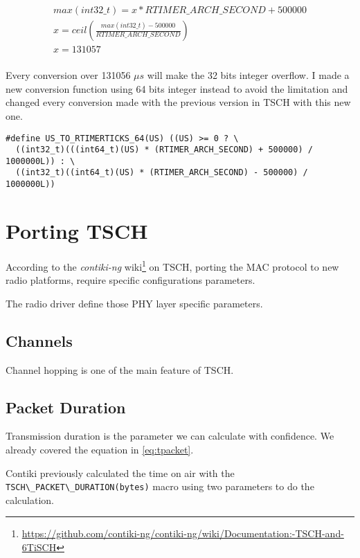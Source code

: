 \begin{equation}
  \label{eq:maxus}
  \begin{multlined}
  max(int32\_t) = x * RTIMER\_ARCH\_SECOND + 500000 \\
  x = ceil(\frac{max(int32\_t) - 500000}{RTIMER\_ARCH\_SECOND}) \\
  x = 131057 \\
  \end{multlined}
\end{equation}

Every conversion over 131056 $\mu s$ will make the 32 bits integer overflow.
I made a new conversion function using 64 bits integer instead to avoid the
limitation and changed every conversion made with the previous version in TSCH
with this new one.

\begin{lstlisting}
#define US_TO_RTIMERTICKS_64(US) ((US) >= 0 ? \
  ((int32_t)(((int64_t)(US) * (RTIMER_ARCH_SECOND) + 500000) / 1000000L)) : \
  ((int32_t)((int64_t)(US) * (RTIMER_ARCH_SECOND) - 500000) / 1000000L)) 
\end{lstlisting}

\section{Porting TSCH}

According to the \emph{contiki-ng}
wiki\footnote{\url{https://github.com/contiki-ng/contiki-ng/wiki/Documentation:-TSCH-and-6TiSCH}}
on TSCH, porting the MAC protocol to new radio platforms, require specific
configurations parameters.

The radio driver define those PHY layer specific parameters.

\subsection{Channels}

Channel hopping is one of the main feature of TSCH. 

\subsection{Packet Duration}

Transmission duration is the parameter we can calculate with confidence.
We already covered the equation in \ref{eq:tpacket}.

Contiki previously calculated the time on air with the
\lstinline{TSCH\_PACKET\_DURATION(bytes)} macro using two parameters to do the
calculation.

